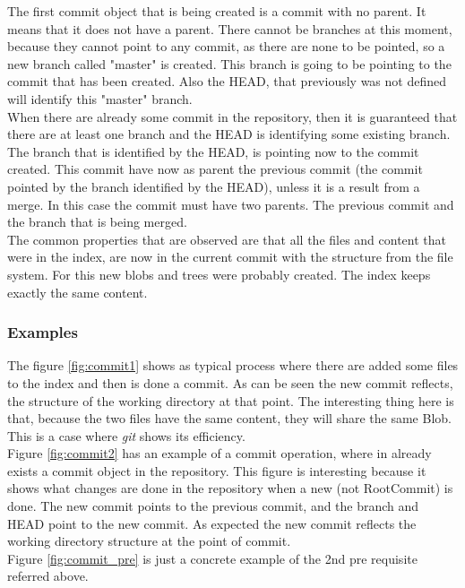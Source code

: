 The first commit object that is being created is a commit with no
parent. It means that it does not have a parent. There cannot be branches
at this moment, because they cannot point to any commit, as there are none to be
pointed, so a new branch called "master" is created. This branch is going to be pointing to 
the commit that has been created. Also the HEAD, that previously was 
not defined will identify this "master" branch.\\

When there are already some commit in the repository, then it is
guaranteed that there are at least one branch and the HEAD is
identifying some existing branch. The branch that is identified by the
HEAD, is pointing now to the commit created. This commit have now as
parent the previous commit (the commit pointed by the branch
identified by the HEAD), unless it is a result from a merge. In this
case the commit must have two parents. The previous commit and the
branch that is being merged.\\

The common properties that are observed are that all the files and
content that were in the index, are now in the current commit with the
structure from the file system. For this new blobs and trees were
probably created. The index keeps exactly the same content.

\subsubsection{Examples}

The figure \ref{fig:commit1} shows as typical process where there are added
some files to the index and then is done a commit. As can be seen the new commit
reflects, the structure of the working directory at that point. 
The interesting thing here is that, because the two files
have the same content, they will share the same
Blob. This is a case where \emph{git} shows its efficiency. \\
Figure \ref{fig:commit2} has an example of a commit operation, where in 
already exists a commit object in the repository. This figure is 
interesting because it shows what changes are done in the repository when a
new (not RootCommit) is done. The new commit points to the previous commit, and
the branch and HEAD point to the new commit. As expected the new commit reflects
the working directory structure at the point of commit.\\
Figure \ref{fig:commit_pre} is just a concrete example of the 2nd pre requisite
referred above. \\

